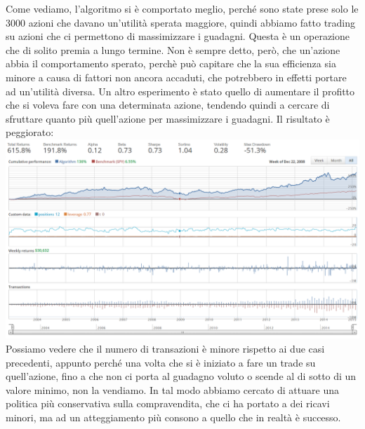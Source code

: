 			Come vediamo, l'algoritmo si è comportato meglio, perché sono state prese solo le 3000 azioni che davano un'utilità sperata maggiore, quindi abbiamo fatto trading su azioni che ci permettono di massimizzare i guadagni. Questa è un operazione che di solito premia a lungo termine. Non è sempre detto, però, che un'azione abbia il comportamento sperato, perchè può capitare che la sua efficienza sia minore a causa di fattori non ancora accaduti, che potrebbero in effetti portare ad un'utilità diversa.
			Un altro esperimento è stato quello di aumentare il profitto che si voleva fare con una determinata azione, tendendo quindi a cercare di sfruttare quanto più quell'azione per massimizzare i guadagni. Il risultato è peggiorato:
			\includegraphics[width=1.0\textwidth, height=0.40\textheight]{stock2.png} 
			Possiamo vedere che il numero di transazioni è minore rispetto ai due casi precedenti, appunto perché una volta che si è iniziato a fare un trade su quell'azione, fino a che non ci porta al guadagno voluto o scende al di sotto di un valore minimo, non la vendiamo. In tal modo abbiamo cercato di attuare una politica più conservativa sulla compravendita, che ci ha portato a dei ricavi minori, ma ad un atteggiamento più consono a quello che in realtà è successo.